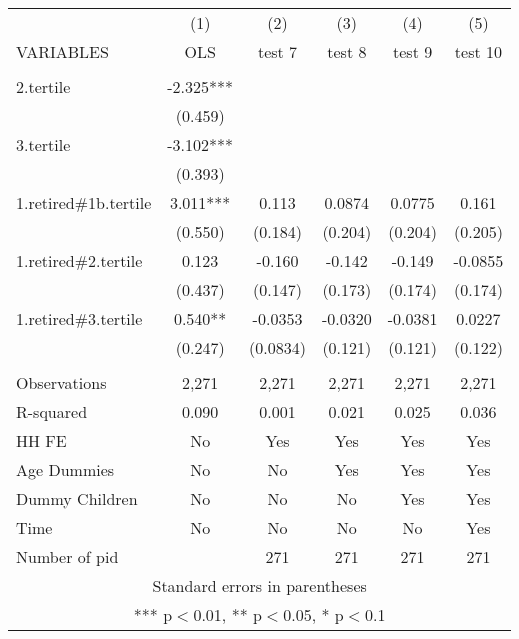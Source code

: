 \begin{tabular}{lccccc} \hline
 & (1) & (2) & (3) & (4) & (5) \\
VARIABLES & OLS & test 7 & test 8 & test 9 & test 10 \\ \hline
 &  &  &  &  &  \\
2.tertile & -2.325*** &  &  &  &  \\
 & (0.459) &  &  &  &  \\
3.tertile & -3.102*** &  &  &  &  \\
 & (0.393) &  &  &  &  \\
1.retired\#1b.tertile & 3.011*** & 0.113 & 0.0874 & 0.0775 & 0.161 \\
 & (0.550) & (0.184) & (0.204) & (0.204) & (0.205) \\
1.retired\#2.tertile & 0.123 & -0.160 & -0.142 & -0.149 & -0.0855 \\
 & (0.437) & (0.147) & (0.173) & (0.174) & (0.174) \\
1.retired\#3.tertile & 0.540** & -0.0353 & -0.0320 & -0.0381 & 0.0227 \\
 & (0.247) & (0.0834) & (0.121) & (0.121) & (0.122) \\
 &  &  &  &  &  \\
Observations & 2,271 & 2,271 & 2,271 & 2,271 & 2,271 \\
R-squared & 0.090 & 0.001 & 0.021 & 0.025 & 0.036 \\
HH FE & No & Yes & Yes & Yes & Yes \\
Age Dummies & No & No & Yes & Yes & Yes \\
Dummy Children & No & No & No & Yes & Yes \\
Time & No & No & No & No & Yes \\
 Number of pid &  & 271 & 271 & 271 & 271 \\ \hline
\multicolumn{6}{c}{ Standard errors in parentheses} \\
\multicolumn{6}{c}{ *** p$<$0.01, ** p$<$0.05, * p$<$0.1} \\
\end{tabular}
